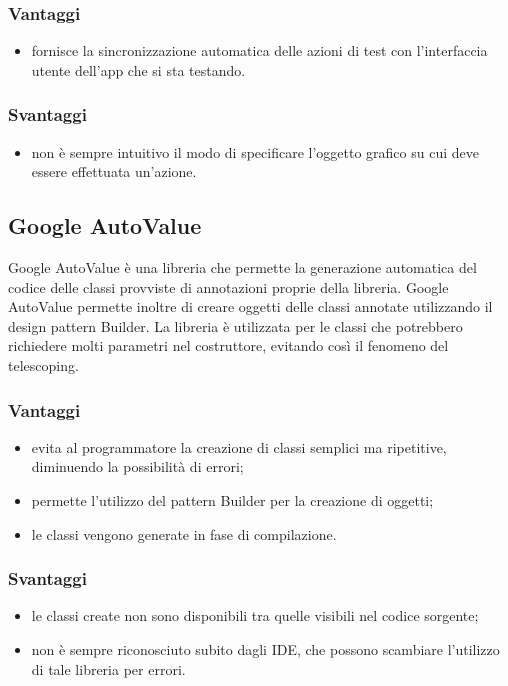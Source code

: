 \documentclass[../Tesi.tex]{subfiles}
\begin{document}
		\subsubsection{Vantaggi}
			\begin{itemize}
				\item fornisce la sincronizzazione automatica delle azioni di test con l'interfaccia utente dell'app che si sta testando.
			\end{itemize}
		\subsubsection{Svantaggi}
			\begin{itemize}
				\item non è sempre intuitivo il modo di specificare l'oggetto grafico su cui deve essere effettuata un'azione.
			\end{itemize}
	\subsection{Google AutoValue}
		Google AutoValue è una libreria che permette la generazione automatica del codice delle classi provviste di annotazioni proprie della libreria. Google AutoValue permette inoltre di creare oggetti delle classi annotate utilizzando il design pattern Builder. La libreria è utilizzata per le classi che potrebbero richiedere molti parametri nel costruttore, evitando così il fenomeno del telescoping. 
		\subsubsection{Vantaggi}
			\begin{itemize}	
				\item evita al programmatore la creazione di classi semplici ma ripetitive, diminuendo la possibilità di errori;
				\item permette l'utilizzo del pattern Builder per la creazione di oggetti;
				\item le classi vengono generate in fase di compilazione.
			\end{itemize}
		\subsubsection{Svantaggi}
			\begin{itemize}
				\item le classi create non sono disponibili tra quelle visibili nel codice sorgente;
				\item non è sempre riconosciuto subito dagli IDE, che possono scambiare l'utilizzo di tale libreria per errori.
			\end{itemize}
\end{document}

